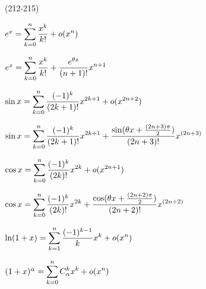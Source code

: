 (212-215)

$e^x = \displaystyle\sum\limits^n_{k = 0} \frac{x^k}{k!} + o(x^n)$

$e^x = \displaystyle\sum\limits^n_{k = 0} \frac{x^k}{k!} + \frac{e^{\theta x}}{(n + 1)!}x^{n + 1}$

$\sin x = \displaystyle\sum\limits^n_{k = 0} \frac{(-1)^k}{(2k + 1)!}x^{2k + 1} + o(x^{2n + 2})$

$\sin x = \displaystyle\sum\limits^n_{k = 0} \frac{(-1)^k}{(2k + 1)!}x^{2k + 1} + \frac{\sin(\theta x + \frac{(2n + 3)\pi}{2})}{(2n + 3)!}x^{(2n + 3)}$

$\cos x = \displaystyle\sum\limits^n_{k = 0} \frac{(-1)^k}{(2k)!}x^{2k} + o(x^{2n + 1})$

$\cos x = \displaystyle\sum\limits^n_{k = 0} \frac{(-1)^k}{(2k)!}x^{2k} + \frac{\cos(\theta x + \frac{(2n + 2)\pi}{2})}{(2n + 2)!}x^{(2n + 2)}$

$\ln(1 + x) = \displaystyle\sum\limits^n_{k = 1}\frac{(-1) ^{k -1}}{k}x^k + o(x^n)$

$(1 + x)^{\alpha} = \displaystyle\sum\limits^n_{k = 0} C^k_\alpha x^k + o(x^n)$